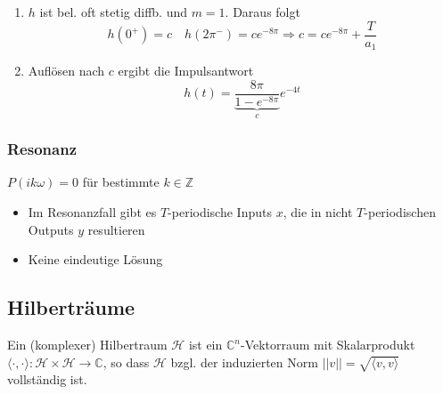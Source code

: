\begin{sectionbox}
\begin{itemize}
\begin{enumerate}
                  \item $h$ ist bel. oft stetig diffb. und $m=1$. Daraus folgt \begin{equation*}
                            h(0^+)=c \quad h(2\pi^-)=ce^{-8\pi} \Rightarrow c=ce^{-8\pi}+\frac{T}{a_1}
                        \end{equation*}
                  \item Auflösen nach $c$ ergibt die Impulsantwort \begin{equation*}
                            h(t) = \underbrace{\frac{8\pi}{1-e^{-8\pi}}}_c e^{-4t}
                        \end{equation*}
              \end{enumerate}
    \end{itemize}
\end{sectionbox}

\begin{sectionbox}
    \subsubsection{Resonanz}
    $P(ik\omega) = 0$ für bestimmte $k\in\mathbb Z$
    \begin{itemize}
        \item Im Resonanzfall gibt es $T$-periodische Inputs $x$, die in nicht $T$-periodischen Outputs $y$ resultieren
        \item Keine eindeutige Lösung
    \end{itemize}
\end{sectionbox}


\subsection{Hilberträume}
\begin{emphbox}
    Ein (komplexer) Hilbertraum $\mathcal H$ ist ein $\mathbb C^n$-Vektorraum mit Skalarprodukt $\langle \cdot, \cdot \rangle : \mathcal H \times \mathcal H \rightarrow \mathbb C$, so dass $\mathcal H$ bzgl. der induzierten Norm $||v|| = \sqrt{\langle v,v\rangle}$ vollständig ist.
\end{emphbox}

